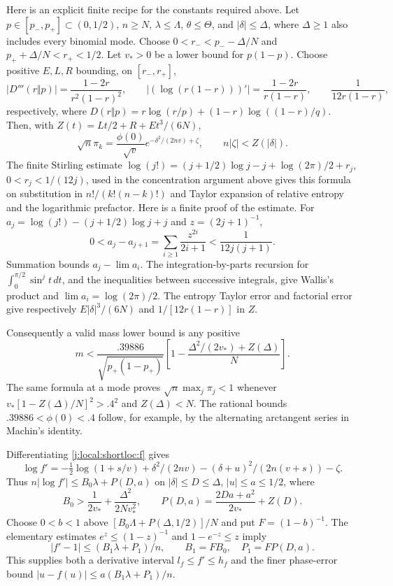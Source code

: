 Here is an explicit finite recipe for the constants required above.
Let $p\in[p_-,p_+]\subset(0,1/2)$, $n\ge N$, $\lambda\le\Lambda$,
$\theta\le\Theta$, and $|\delta|\le\Delta$, where $\Delta\ge1$ also includes
every binomial mode. Choose $0<r_-<p_- -\Delta/N$ and
$p_++\Delta/N<r_+<1/2$. Let $v_*>0$ be a lower bound for $p(1-p)$.
Choose positive $E,L,R$ bounding, on $[r_-,r_+]$,
\[
 |D'''(r\Vert p)|=\frac{1-2r}{r^2(1-r)^2},\qquad
 |(\log(r(1-r)))'|=\frac{1-2r}{r(1-r)},\qquad
 \frac1{12r(1-r)},
\]
respectively, where $D(r\Vert p)=r\log(r/p)+(1-r)\log((1-r)/q)$.
Then, with $Z(t)=Lt/2+R+Et^3/(6N)$,
\begin{equation}\label{j:local:shortloc:mass}
 \sqrt n\pi_k=\frac{\phi(0)}{\sqrt v}
       e^{-\delta^2/(2nv)+\zeta},\qquad n|\zeta|<Z(|\delta|).
\end{equation}
The finite Stirling estimate
$\log(j!)=(j+1/2)\log j-j+\log(2\pi)/2+r_j$, $0<r_j<1/(12j)$,
used in the concentration argument above gives this formula on substitution
in $n!/(k!(n-k)!)$ and Taylor expansion of relative entropy and the logarithmic
prefactor. Here is a finite proof of the estimate. For
$a_j=\log(j!)-(j+1/2)\log j+j$ and $z=(2j+1)^{-1}$,
\[
0<a_j-a_{j+1}=\sum_{i\ge1}\frac{z^{2i}}{2i+1}<\frac1{12j(j+1)}.
\]
Summation bounds $a_j-\lim a_i$. The integration-by-parts recursion for
$\int_0^{\pi/2}\sin^j t\,dt$, and the inequalities between successive
integrals, give Wallis's product and $\lim a_i=\log(2\pi)/2$.
The entropy Taylor error and factorial error give respectively
$E|\delta|^3/(6N)$ and $1/[12r(1-r)]$ in $Z$.

Consequently a valid mass lower bound is any positive
\begin{equation}\label{j:local:shortloc:m}
 m<\frac{.39886}{\sqrt{p_+(1-p_+)}}
          \left[1-\frac{\Delta^2/(2v_*)+Z(\Delta)}N\right].
\end{equation}
The same formula at a mode proves $\sqrt n\max_j\pi_j<1$ whenever
$v_*[1-Z(\Delta)/N]^2>.4^2$ and $Z(\Delta)<N$.
The rational bounds $.39886<\phi(0)<.4$ follow, for example, by the
alternating arctangent series in Machin's identity.

Differentiating \eqref{j:local:shortloc:f} gives
\begin{equation}\label{j:local:shortloc:logder}
 \log f'=-\tfrac12\log(1+s/v)+\delta^2/(2nv)
                   -(\delta+u)^2/(2n(v+s))-\zeta.
\end{equation}
Thus $n|\log f'|\le B_0\lambda+P(D,a)$ on $|\delta|\le D\le\Delta$,
$|u|\le a\le1/2$, where
\[
 B_0>\frac1{2v_*}+\frac{\Delta^2}{2Nv_*^2},\qquad
 P(D,a)=\frac{2Da+a^2}{2v_*}+Z(D).
\]
Choose $0<b<1$ above $[B_0\Lambda+P(\Delta,1/2)]/N$ and put
$F=(1-b)^{-1}$. The elementary estimates $e^z\le(1-z)^{-1}$ and
$1-e^{-z}\le z$ imply
\begin{equation}\label{j:local:shortloc:derivative}
 |f'-1|\le(B_1\lambda+P_1)/n,\qquad B_1=FB_0,\quad P_1=FP(D,a).
\end{equation}
This supplies both a derivative interval $l_f\le f'\le h_f$ and the
finer phase-error bound $|u-f(u)|\le a(B_1\lambda+P_1)/n$.

